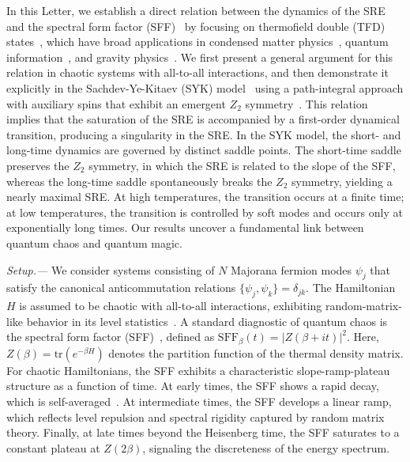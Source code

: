 \documentclass[aps,prl,twocolumn,superscriptaddress,longbibliography]{revtex4-2}
\begin{document}
  In this Letter, we establish a direct relation between the dynamics of the SRE and the spectral form factor (SFF)~\cite{Cotler:2016fpe,Saad:2018bqo,Khramtsov:2020bvs} by focusing on thermofield double (TFD) states~\cite{Israel:1976ur,Maldacena:2001kr}, which have broad applications in condensed matter physics~\cite{Liu:2024mme,Weinstein:2024fug}, quantum information~\cite{Gao:2016bin,Maldacena:2017axo,Susskind:2017nto,Gao:2018yzk,Brown:2019hmk,Gao:2019nyj,Schuster:2021uvg,Jafferis:2022crx,Zhou:2024osg,Liu:2024nhs}, and gravity physics~\cite{Maldacena:2001kr}. We first present a general argument for this relation in chaotic systems with all-to-all interactions, and then demonstrate it explicitly in the Sachdev-Ye-Kitaev (SYK) model~\cite{Sachdev:1992fk,kitaev2014talk,maldacena2016remarks,RevModPhys.94.035004} using a path-integral approach with auxiliary spins that exhibit an emergent $Z_2$ symmetry~\cite{Zhang:2025rky}. This relation implies that the saturation of the SRE is accompanied by a first-order dynamical transition, producing a singularity in the SRE. In the SYK model, the short- and long-time dynamics are governed by distinct saddle points. The short-time saddle preserves the $Z_2$ symmetry, in which the SRE is related to the slope of the SFF, whereas the long-time saddle spontaneously breaks the $Z_2$ symmetry, yielding a nearly maximal SRE. At high temperatures, the transition occurs at a finite time; at low temperatures, the transition is controlled by soft modes and occurs only at exponentially long times. Our results uncover a fundamental link between quantum chaos and quantum magic.


  \emph{ \color{blue}Setup.---} We consider systems consisting of $N$ Majorana fermion modes $\psi_j$ that satisfy the canonical anticommutation relations $\{\psi_j,\psi_k\}=\delta_{jk}$. The Hamiltonian $H$ is assumed to be chaotic with all-to-all interactions, exhibiting random-matrix-like behavior in its level statistics~\cite{mehta2004random,Cotler:2016fpe}. A standard diagnostic of quantum chaos is the spectral form factor (SFF)~\cite{Cotler:2016fpe,Saad:2018bqo,Khramtsov:2020bvs}, defined as $\mathrm{SFF}_\beta(t)=\big|Z\left(\beta+it\right)\big|^2$. Here, $Z(\beta)=\mathrm{tr}\left(e^{-\beta H}\right)$ denotes the partition function of the thermal density matrix. For chaotic Hamiltonians, the SFF exhibits a characteristic slope-ramp-plateau structure as a function of time. At early times, the SFF shows a rapid decay, which is self-averaged~\cite{Saad:2018bqo}. At intermediate times, the SFF develops a linear ramp, which reflects level repulsion and spectral rigidity captured by random matrix theory. Finally, at late times beyond the Heisenberg time, the SFF saturates to a constant plateau at $Z(2\beta)$, signaling the discreteness of the energy spectrum.
\end{document}
